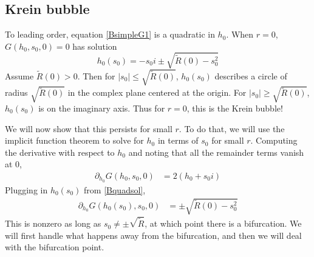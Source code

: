 \documentclass[thesis.tex]{subfiles}
\begin{document}
\subsection{Krein bubble}

To leading order, equation \cref{BsimpleG1} is a quadratic in $h_0$. When $r = 0$, $G(h_0, s_0, 0) = 0$ has solution
\begin{equation}\label{Bquadsol}
h_0(s_0) = -s_0 i \pm \sqrt{ \tilde{R}(0) - s_0^2 }
\end{equation}
Assume $\tilde{R}(0) > 0$. Then for $|s_0| \leq \sqrt{\tilde{R}(0)}$, $h_0(s_0)$ describes a circle of radius $\sqrt{\tilde{R}(0)}$ in the complex plane centered at the origin. For $|s_0| \geq \sqrt{\tilde{R}(0)}$, $h_0(s_0)$ is on the imaginary axis. Thus for $r = 0$, this is the Krein bubble!

We will now show that this persists for small $r$. To do that, we will use the implicit function theorem to solve for $h_0$ in terms of $s_0$ for small $r$. Computing the derivative with respect to $h_0$ and noting that all the remainder terms vanish at 0,
\begin{align*}
\partial_{h_0} G(h_0, s_0, 0) 
&= 2 ( h_0 + s_0 i)
\end{align*}
Plugging in $h_0(s_0)$ from \cref{Bquadsol},
\begin{align*}
\partial_{h_0} G(h_0(s_0), s_0, 0) 
&= \pm \sqrt{ \tilde{R}(0) - s_0^2 }
\end{align*}
This is nonzero as long as $s_0 \neq \pm \sqrt{\tilde{R}}$, at which point there is a bifurcation. We will first handle what happens away from the bifurcation, and then we will deal with the bifurcation point.
\end{document}
